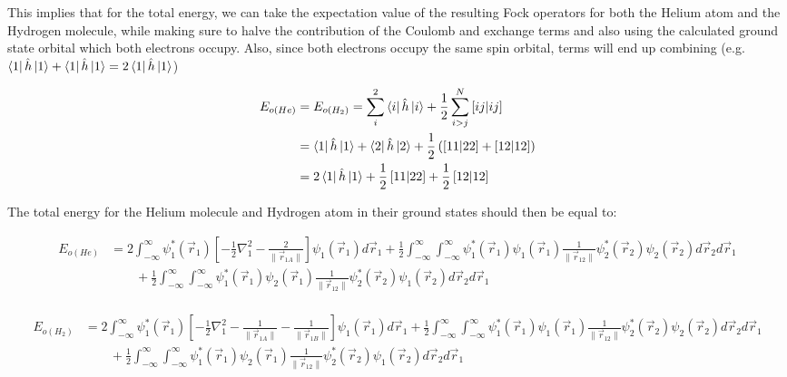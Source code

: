 \documentclass[10pt, oneside, letterpaper]{article}
\begin{document}
This implies that for the total energy, we can take the expectation value of the resulting Fock operators for both the Helium atom and the Hydrogen molecule, while making sure to halve the contribution of the Coulomb and exchange terms and also using the calculated ground state orbital which both electrons occupy. Also, since both electrons occupy the same spin orbital, terms will end up combining (e.g. $\bra{1}\hat{h}\ket{1} + \bra{1}\hat{h}\ket{1} = 2\bra{1}\hat{h}\ket{1}$)

\begin{align*}
  E_{o(He)} &= E_{o(H_2)} = \sum_i^2\bra{i}\hat{h}\ket{i} + \frac{1}{2}\sum_{i>j}^N\left[ij\middle|ij\right] \\
  &= \bra{1}\hat{h}\ket{1} + \bra{2}\hat{h}\ket{2} + \frac{1}{2}\left(\left[11\middle|22\right] + \left[12\middle|12\right]\right) \\
  &= 2\bra{1}\hat{h}\ket{1} + \frac{1}{2}\left[11\middle|22\right] + \frac{1}{2}\left[12\middle|12\right]
\end{align*}

The total energy for the Helium molecule and Hydrogen atom in their ground states should then be equal to:

\begin{align*}
  E_{o(He)} &= 2\int_{-\infty}^{\infty}\psi_1^\ast(\vec{r}_1) \left[ -\frac{1}{2}\nabla_1^2 - \frac{2}{\|\vec{r}_{1 A}\|} \right] \psi_1(\vec{r}_1) d\vec{r}_1 + 
   \frac{1}{2}\int_{-\infty}^{\infty}\int_{-\infty}^{\infty} \psi_1^\ast(\vec{r}_1) \psi_1(\vec{r}_1) \frac{1}{\|\vec{r}_{12}\|} \psi_2^\ast(\vec{r}_2)\psi_2(\vec{r}_2) d\vec{r}_2d\vec{r}_1 \\
   &\qquad + \frac{1}{2}\int_{-\infty}^{\infty}\int_{-\infty}^{\infty} \psi_1^\ast(\vec{r}_1) \psi_2(\vec{r}_1) \frac{1}{\|\vec{r}_{12}\|} \psi_2^\ast(\vec{r}_2)\psi_1(\vec{r}_2) d\vec{r}_2d\vec{r}_1  \\
\end{align*}

\begin{align*}
  E_{o(H_2)} &= 2\int_{-\infty}^{\infty}\psi_1^\ast(\vec{r}_1) \left[ -\frac{1}{2}\nabla_1^2 - \frac{1}{\|\vec{r}_{1 A}\|} - \frac{1}{\|\vec{r}_{1 B}\|} \right] \psi_1(\vec{r}_1) d\vec{r}_1 +
   \frac{1}{2}\int_{-\infty}^{\infty}\int_{-\infty}^{\infty} \psi_1^\ast(\vec{r}_1) \psi_1(\vec{r}_1) \frac{1}{\|\vec{r}_{12}\|} \psi_2^\ast(\vec{r}_2)\psi_2(\vec{r}_2) d\vec{r}_2d\vec{r}_1 \\
   &\qquad + \frac{1}{2}\int_{-\infty}^{\infty}\int_{-\infty}^{\infty} \psi_1^\ast(\vec{r}_1) \psi_2(\vec{r}_1) \frac{1}{\|\vec{r}_{12}\|} \psi_2^\ast(\vec{r}_2)\psi_1(\vec{r}_2) d\vec{r}_2d\vec{r}_1  \\
\end{align*}
\end{document}
